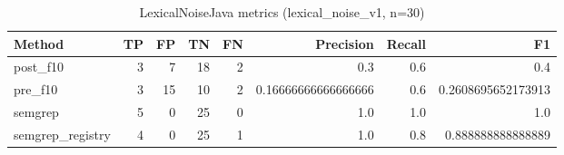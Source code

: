 \begin{table}[h]
\centering
\begin{tabular}{lrrrrrrr}
\hline
Method & TP & FP & TN & FN & Precision & Recall & F1 \\
\hline
post\_f10 & 3 & 7 & 18 & 2 & 0.3 & 0.6 & 0.4 \\
pre\_f10 & 3 & 15 & 10 & 2 & 0.16666666666666666 & 0.6 & 0.2608695652173913 \\
semgrep & 5 & 0 & 25 & 0 & 1.0 & 1.0 & 1.0 \\
semgrep\_registry & 4 & 0 & 25 & 1 & 1.0 & 0.8 & 0.888888888888889 \\
\hline
\end{tabular}
\caption{LexicalNoiseJava metrics (lexical\_noise\_v1, n=30)}
\end{table}
